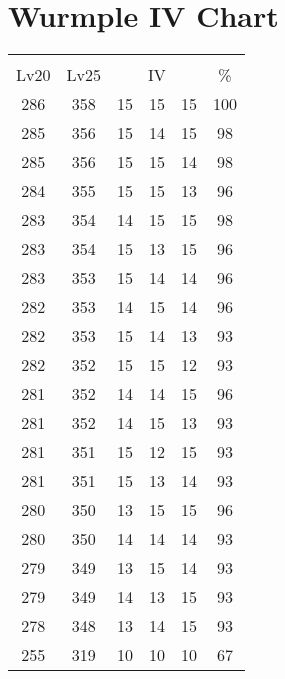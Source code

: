 \documentclass{article}%
\begin{document}
%
\normalsize%
\section{Wurmple IV Chart}%
\label{sec:Wurmple IV Chart}%
\renewcommand{\arraystretch}{1.5}%
\begin{tabular}{|c|c|c|c|c|c|}%
\hline%
\multicolumn{6}{|c|}{\textcolor{white}{ 
\linebreak{Wurmple}
}%
\cellcolor{black}}\\%
\multicolumn{1}{|c}{Lv20}&\multicolumn{1}{c|}{Lv25}&\multicolumn{3}{c|}{IV}&\multicolumn{1}{|c|}{\%}\\%
\hline%
\rowcolor{color100}%
286&358&15&15&15&100\\%
\hline%
\rowcolor{color98}%
285&356&15&14&15&98\\%
\hline%
\rowcolor{color98}%
285&356&15&15&14&98\\%
\hline%
\rowcolor{color96}%
284&355&15&15&13&96\\%
\hline%
\rowcolor{color98}%
283&354&14&15&15&98\\%
\hline%
\rowcolor{color96}%
283&354&15&13&15&96\\%
\hline%
\rowcolor{color96}%
283&353&15&14&14&96\\%
\hline%
\rowcolor{color96}%
282&353&14&15&14&96\\%
\hline%
\rowcolor{color93}%
282&353&15&14&13&93\\%
\hline%
\rowcolor{color93}%
282&352&15&15&12&93\\%
\hline%
\rowcolor{color96}%
281&352&14&14&15&96\\%
\hline%
\rowcolor{color93}%
281&352&14&15&13&93\\%
\hline%
\rowcolor{color93}%
281&351&15&12&15&93\\%
\hline%
\rowcolor{color93}%
281&351&15&13&14&93\\%
\hline%
\rowcolor{color96}%
280&350&13&15&15&96\\%
\hline%
\rowcolor{color93}%
280&350&14&14&14&93\\%
\hline%
\rowcolor{color93}%
279&349&13&15&14&93\\%
\hline%
\rowcolor{color93}%
279&349&14&13&15&93\\%
\hline%
\rowcolor{color93}%
278&348&13&14&15&93\\%
\hline%
\rowcolor{color91}%
255&319&10&10&10&67\\%
\end{tabular}

%
\end{document}
